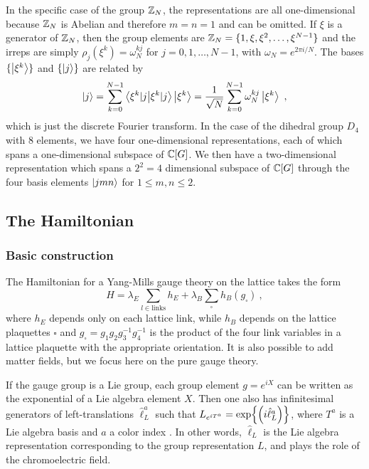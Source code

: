 In the specific case of the group $\mathbb{Z}_N$, the representations are all one-dimensional because $\mathbb{Z}_N$ is Abelian and therefore $m=n=1$ and can be omitted.
If $\xi$ is a generator of $\mathbb{Z}_N$, then the group elements are $\mathbb{Z}_N = \{1, \xi, \xi^2, \ldots, \xi^{N-1}\}$ and the irreps are simply $\rho_j (\xi^k) = \omega_N^{kj}$ for $j = 0,1,\ldots, N-1$, with $\omega_N= e^{2\pi i /N}$.
The bases $\{\ket{\xi^k}\}$ and $\{\ket{j}\}$ are related by
\begin{equation}
    \ket{j} = \sum_{k=0}^{N-1} \braket{\xi^k|j} \ket{\xi^k} = \frac{1}{\sqrt{N}}\sum_{k=0}^{N-1} \omega_N^{kj} \ket{\xi^k} \ ,
\end{equation}
which is just the discrete Fourier transform.
In the case of the dihedral group $D_4$ with $8$ elements, we have four one-dimensional representations, each of which spans a one-dimensional subspace of $\mathbb{C}[G]$.
We then have a two-dimensional representation which spans a $2^2=4$ dimensional subspace of $\mathbb{C}[G]$ through the four basis elements $\ket{jmn}$ for $1 \leq m, n \leq 2$.


\subsection{The Hamiltonian}

\subsubsection{Basic construction}\label{sec:hamiltonian basic construction}

The Hamiltonian for a Yang-Mills gauge theory on the lattice takes the form \cite{kogut1975hamiltonian, zohar2015latticegauge}
\begin{equation}
    \label{eq:generic hamiltonian}
    H = \lambda_E \sum_{l \in \mathrm{links}} h_E + \lambda_B \sum_{\square} h_B(g_\square) \ ,
\end{equation}
where $h_E$ depends only on each lattice link, while $h_B$ depends on the lattice plaquettes $\square$ and $g_\square = g_1 g_2 g_3^{-1} g_4^{-1}$ is the product of the four link variables in a lattice plaquette with the appropriate orientation.
It is also possible to add matter fields, but we focus here on the pure gauge theory.

If the gauge group is a Lie group, each group element $g = e^{iX}$ can be written as the exponential of a Lie algebra element $X$.
Then one also has infinitesimal generators of left-translations $\hat{\ell}^a_L$ such that $L_{e^{iT^a}} = \exp{\pqty{i \hat{\ell}_L^a}}$, where $T^a$ is a Lie algebra basis and $a$ a color index \cite{milstead2018qyangmills}.
In other words, $\hat{\ell}_L$ is the Lie algebra representation corresponding to the group representation $L$, and plays the role of the chromoelectric field.

